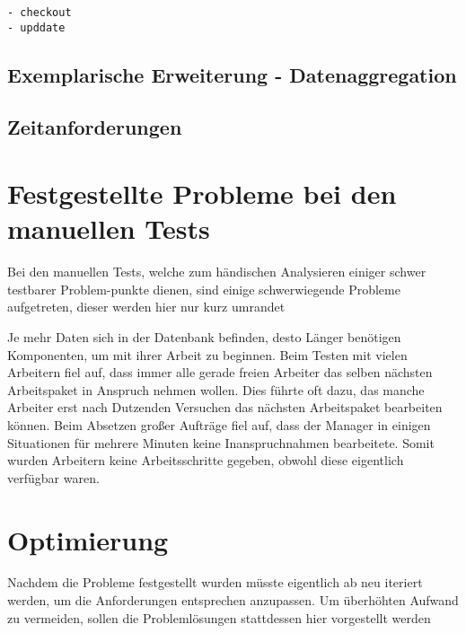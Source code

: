 \begin{verbatim}
- checkout
- upddate
\end{verbatim}

\subsection{Exemplarische Erweiterung - Datenaggregation}

\subsection{Zeitanforderungen}

\section{Festgestellte Probleme bei den manuellen Tests}

Bei den manuellen Tests, welche zum händischen Analysieren
einiger schwer testbarer Problem-punkte dienen,
sind einige schwerwiegende Probleme aufgetreten,
dieser werden hier nur kurz umrandet 

\begin{description}
        Je mehr Daten sich in der Datenbank befinden,
        desto Länger benötigen Komponenten, um mit ihrer Arbeit zu beginnen.
        Beim Testen mit vielen Arbeitern fiel auf, dass immer alle gerade freien Arbeiter das selben nächsten Arbeitspaket in Anspruch nehmen wollen. Dies führte oft dazu, das manche Arbeiter erst nach Dutzenden Versuchen das nächsten Arbeitspaket bearbeiten können.
        Beim Absetzen großer Aufträge fiel auf,
        dass der Manager in einigen Situationen für mehrere Minuten keine
        Inanspruchnahmen bearbeitete.
        Somit wurden Arbeitern keine Arbeitsschritte gegeben, obwohl diese eigentlich verfügbar waren.
\end{description}

\section{Optimierung}

Nachdem die Probleme festgestellt wurden
müsste eigentlich ab  neu iteriert werden,
um die Anforderungen entsprechen anzupassen.
Um überhöhten Aufwand zu vermeiden,
sollen die Problemlösungen stattdessen hier vorgestellt werden 

